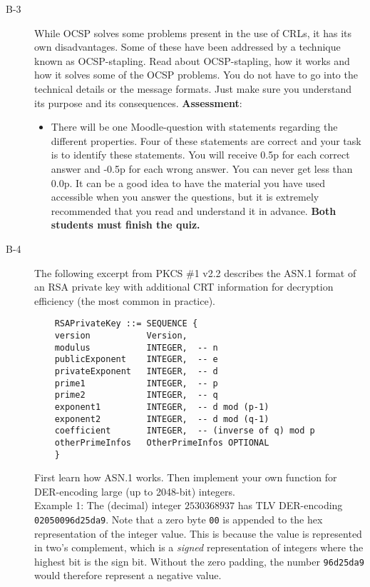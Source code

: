 \documentclass{article}
\begin{document}
\begin{description}
	\item[B-3]{While OCSP solves some problems present in the use of CRLs, it has its own disadvantages. Some of these have been addressed by a technique known as OCSP-stapling. Read about OCSP-stapling, how it works and how it solves some of the OCSP problems. You do not have to go into the technical details or the message formats. Just make sure you understand its purpose and its consequences.}
    \textbf{Assessment}:
	\begin{itemize}
		\item There will be one Moodle-question with statements regarding the different properties. Four of these statements are correct and your task is to identify these statements. You will receive 0.5p for each correct answer and -0.5p for each wrong answer. You can never get less than 0.0p. It can be a good idea to have the material you have used accessible when you answer the questions, but it is extremely recommended that you read and understand it in advance. \textbf{Both students must finish the quiz.}
	\end{itemize}

	\item[B-4]{The following excerpt from PKCS \#1 v2.2 describes the ASN.1 format of an RSA private key with additional CRT information for decryption efficiency (the most common in practice).
\begin{verbatim}
    RSAPrivateKey ::= SEQUENCE {
    version           Version,
    modulus           INTEGER,  -- n
    publicExponent    INTEGER,  -- e
    privateExponent   INTEGER,  -- d
    prime1            INTEGER,  -- p
    prime2            INTEGER,  -- q
    exponent1         INTEGER,  -- d mod (p-1)
    exponent2         INTEGER,  -- d mod (q-1)
    coefficient       INTEGER,  -- (inverse of q) mod p
    otherPrimeInfos   OtherPrimeInfos OPTIONAL
    }
\end{verbatim}
First learn how ASN.1 works. Then implement your own function for DER-encoding large (up to 2048-bit) integers.\\

    Example 1: The (decimal) integer $2530368937$ has TLV DER-encoding \verb!02050096d25da9!. Note that a zero byte \verb!00! is appended to the hex representation of the integer value. This is because the value is represented in two's complement, which is a \textit{signed} representation of integers where the highest bit is the sign bit. Without the zero padding, the number \verb!96d25da9! would therefore represent a negative value.\\

}
\end{description}
\end{document}
